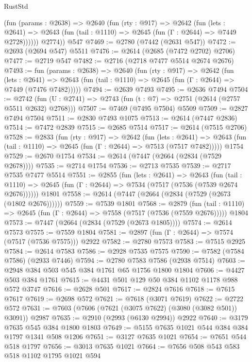 \begin{lexlean}{RustStd}
\begin{coremodule}
          (fun (params : @2638) =>
          @2640
            (fun (rty : @917) =>
            @2642
              (fun (lets : @2641) =>
              @2643 (fun (tail : @1110) => @2645 (fun (Γ : @2644) => @7449 @2728))))))
        @2774))
    @547
@7469 := @2780 (@7442 (@2631 @547))
@7472 := @2693 (@2694 @547) @5511
@7476 := @2614 (@2685 (@7472 @2702) @2706)
@7477 := @2719 @547
@7482 := @2716 (@2718 @7477 @5514 @2674 @2676)
@7493 := fun (params : @2638) =>
  @2640
    (fun (rty : @917) =>
    @2642
      (fun (lets : @2641) =>
      @2643 (fun (tail : @1110) => @2645 (fun (Γ : @2644) => @7449 (@7476 @7482)))))
@7494 := @2639 @7493
@7495 := @2636 @7494
@7504 := @2742 (fun (U : @2741) => @2743 (fun (t : @7) => @2751 (@2614 (@2757 @5511 @2632) @2768)))
@7507 := @7469 (@7495 @7504) @5509
@7509 := @2827 @7494 @7504
@7511 := @2830 @7493 @1075
@7513 := @2614 (@7447 @2836)
@7514 := @7472 @2839
@7515 := @2685 @7514
@7517 := @2614 (@7515 @2706)
@7528 := @2833
    (fun (rty : @917) =>
    @2642
      (fun (lets : @2641) =>
      @2643 (fun (tail : @1110) => @2645 (fun (Γ : @2644) => @7513 (@7517 @7482)))))
    @1754
@7529 := @2670 @1754
@7534 := @2614 (@7447 (@2664 (@2834 (@7529 @2678))))
@7535 := @2714 @1754
@7536 := @2713 @7535
@7539 := @2717 @7535 @7477 @5514
@7551 := @2855
    (fun (lets : @2641) =>
    @2643
      (fun (tail : @1110) => @2645 (fun (Γ : @2644) => @7534 (@7517 (@7536 (@7539 @2674 @2676))))))
    @1801
@7558 := @2614 (@7447 (@2664 (@2834 (@7529 (@2673 (@1802 @2676))))))
@7559 := @7539 @1801
@7568 := @2879
    (fun (tail : @1110) => @2645 (fun (Γ : @2644) => @7558 (@7517 (@7536 (@7559 @2676)))))
    @1804
@7573 := @7447 (@2664 (@2834 (@7529 (@2673 @1805))))
@7574 := @2614 @7573
@7575 := @7559 @1804
@7581 := @2897 (fun (Γ : @2644) => @7574 (@7517 (@7536 @7575))) @2922
@7582 := @2780 @7573
@7583 := @7515 @2925
@7584 := @2614 @7583
@7586 := @2928 @7535 @7575
@7590 := @7582 (@7584 @7586) (@2933 @7446)
@7594 := @2780 @7583 @7586 (@2938 @7514)
@7603 := @2948 @384 @503 @545 @384 @1761 @65 @1756 @1800 @1804
@7606 := @4427 @503 @384 @1761
@7615 := @4431 @501 @129 @50 @384 @1102 @1178 @988 @572 @3747
@7616 := @2628 @501
@7617 := @2824 @7616
@7618 := @7615 @7617
@7619 := @2698 @572
@7621 := @7618 (@3071 @7619)
@7622 := @2722 @572
@7631 := @7603 (@7606 (@7621 (@3075 @7622) (@3080 (@3082 @501)) @3091)) @2987
@7635 := @2910 (@2993 (@6130 @2994)) @2922
@7640 := @3179 @7635 @545 @384 @1800 @1803
@7649 := @5155 @7635 @1021 @544 @384 @384 @1797 @1341 @508 @1206
@7651 := @3127 @7635 @1021
@7654 := @7651 @544 @518 @1797
@7656 := @3013 @7635 @1021
@7664 := @7656 @508 @543 @583 @518 @1102 @1795 @1021 @594

\end{coremodule}
\end{lexlean}
